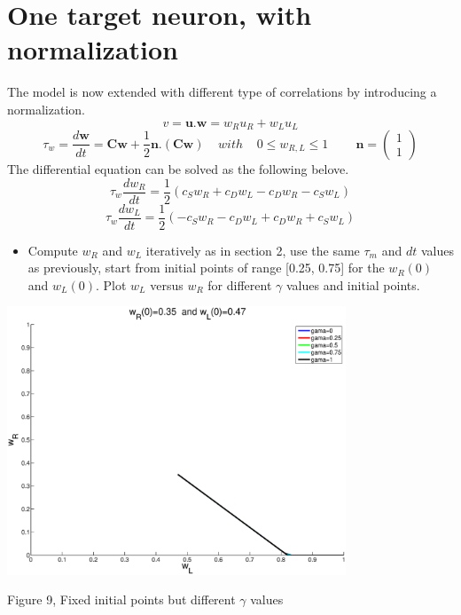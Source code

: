 \documentclass{article}
\begin{document}
\section{One target neuron, with normalization}
The model is now extended with different type of correlations by introducing a normalization.
\begin{equation*}
 v=\textbf{u.w}=w_R u_R + w_L u_L
\end{equation*}
\begin{equation}
 \tau_w=\frac{d\textbf{w}}{dt}=\textbf{Cw}+ \frac{1}{2}\textbf{n.}(\textbf{Cw}) \;\;\;\; with \;\;\;\; 0\leq w_{R,L}\leq 1 \;\;\;\;\;\;\;\; \textbf{n}= \left ( \begin{array}{c} 1 \\ 1 \end{array} \right )
\end{equation}
The differential equation can be solved as the following belove.
\begin{equation*}
 \tau_w \frac{dw_R}{dt}=\frac{1}{2}(c_S w_R + c_D w_L - c_Dw_R - c_Sw_L)
\end{equation*}
\begin{equation*}
 \tau_w \frac{dw_L}{dt}=\frac{1}{2}(-c_S w_R - c_D w_L + c_Dw_R + c_Sw_L)
\end{equation*}

\begin{itemize}
 \item Compute $w_R$ and $w_L$ iteratively as in section 2, use the same $\tau_m$ and $dt$ values as previously, start from initial points of range [0.25, 0.75] for the $w_R(0)$ and $w_L(0)$. Plot $w_L$ versus $w_R$ for different $\gamma$ values and initial points.  
\end{itemize}

\begin{center}
\includegraphics[width=\textwidth, height=80mm]{nomr_gama.eps}
\begin{footnotesize}
 Figure 9, Fixed initial points but different $\gamma$ values
\end{footnotesize}
\end{center}
\end{document}
